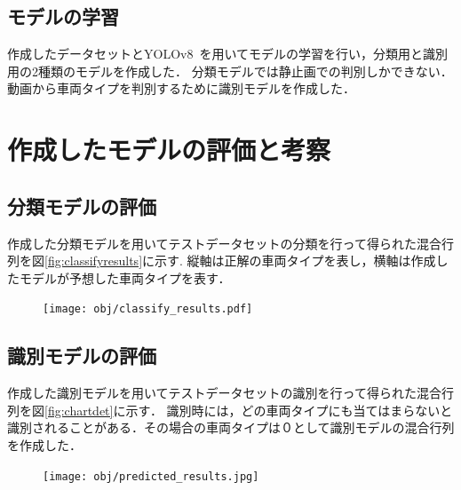 \begin{multicols*}{2}
\subsection{モデルの学習}
作成したデータセットとYOLOv8~\cite{bk0}を用いてモデルの学習を行い，分類用と識別用の2種類のモデルを作成した．
分類モデルでは静止画での判別しかできない．動画から車両タイプを判別するために識別モデルを作成した．




\section{作成したモデルの評価と考察}
\subsection{分類モデルの評価}
作成した分類モデルを用いてテストデータセットの分類を行って得られた混合行列を図\ref{fig:classifyresults}に示す.
縦軸は正解の車両タイプを表し，横軸は作成したモデルが予想した車両タイプを表す．
\begin{figure}
	\centering
	\texttt{[image: obj/classify\_results.pdf]}
\end{figure}

\subsection{識別モデルの評価}
作成した識別モデルを用いてテストデータセットの識別を行って得られた混合行列を図\ref{fig:chartdet}に示す．
識別時には，どの車両タイプにも当てはまらないと識別されることがある．その場合の車両タイプは０として識別モデルの混合行列を作成した．
\begin{figure}
	\centering
	\texttt{[image: obj/predicted\_results.jpg]}
\end{figure}






\end{multicols*}
